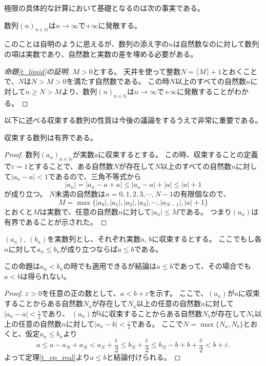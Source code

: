 極限の具体的な計算において基礎となるのは次の事実である。

\begin{proposition}
\label{t_limid}
数列$(n)_{n \in \mathbb{N}}$は$n \to \infty$で$+\infty$に発散する。
\end{proposition}

このことは自明のように思えるが、数列の添え字の$n$は自然数なのに対して数列の項は実数であり、自然数と実数の差を埋める必要がある。

\begin{proof}[命題\ref{t_limid}の証明]
$M > 0$とする。
天井を使って整数$N = \lceil M \rceil+1$とおくことで、$N$は$N > M > 0$を満たす自然数である。
この時$N$以上のすべての自然数$n$に対して$n \ge N > M$より、数列$(n)_{n \in \mathbb{N}}$は$n \to \infty$で$+\infty$に発散することがわかる。
\end{proof}

以下に述べる収束する数列の性質は今後の議論をするうえで非常に重要である。

\begin{proposition}
\label{t_conv_bdd}
収束する数列は有界である。
\end{proposition}

\begin{proof}
数列$(a_n)_{n \in \mathbb{N}}$が実数$a$に収束するとする。
この時、収束することの定義で$\varepsilon = 1$とすることで、ある自然数$N$が存在して$N$以上のすべての自然数$n$に対して$|a_n-a| < 1$であるので、三角不等式から
$$
|a_n| = |a_n-a+a| \le |a_n-a|+|a| \le |a|+1
$$
が成り立つ。
$N$未満の自然数は$n = 0, 1, 2, 3, \cdots, N-1$の有限個なので、
$$
M = \max\{ |a_0|, |a_1|, |a_2|, |a_3|, \cdots, |a_{N-1}|, |a|+1 \}
$$
とおくと$M$は実数で、任意の自然数$n$に対して$|a_n| \le M$である。
つまり$(a_n)$は有界であることが示された。
\end{proof}

\begin{proposition}[極限と大小関係]
\label{t_limord}
$(a_n)$, $(b_n)$を実数列とし、それぞれ実数$a$, $b$に収束するとする。
ここでもし各$n$に対して$a_n \le b_n$が成り立つならば$a \le b$である。
\end{proposition}

\begin{remark}
この命題は$a_n < b_n$の時でも適用できるが結論は$a \le b$であって、その場合でも$a < b$は得られない。
\end{remark}

\begin{proof}
$\varepsilon > 0$を任意の正の数として、$a < b+\varepsilon$を示す。
ここで、$(a_n)$が$a$に収束することからある自然数$N_a$が存在して$N_a$以上の任意の自然数$n$に対して$|a_n-a| < \frac{\varepsilon}{2}$であり、
$(a_n)$が$b$に収束することからある自然数$N_b$が存在して$N_b$以上の任意の自然数$n$に対して$|a_n-b| < \frac{\varepsilon}{2}$である。
ここで$N = \max\{ N_a, N_b \}$とおくと、仮定$a_n \le b_n$より
$$
a \le a-a_N+a_N < a_N+\frac{\varepsilon}{2} \le b_N+\frac{\varepsilon}{2} \le b_N-b+b+\frac{\varepsilon}{2} < b+\varepsilon.
$$
よって定理\ref{t_ep_real}より$a \le b$と結論付けられる。
\end{proof}

